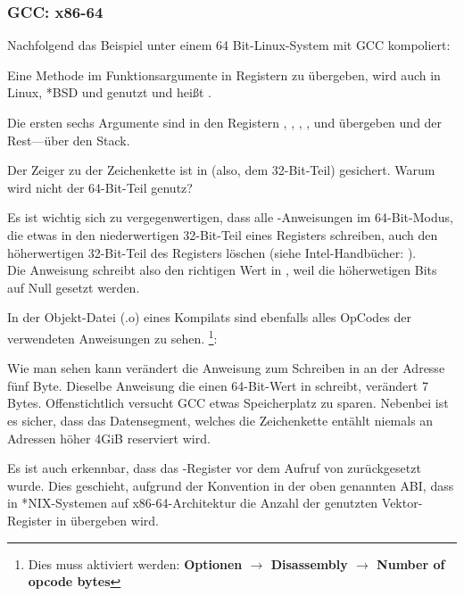 \subsubsection{GCC: x86-64}

Nachfolgend das Beispiel unter einem 64 Bit-Linux-System mit GCC kompoliert:



Eine Methode im Funktionsargumente in Registern zu übergeben, wird auch in Linux, *BSD und \MacOSX genutzt und heißt \SysVABI.

Die ersten sechs Argumente sind in den Registern \RDI, \RSI, \RDX, \RCX, und  übergeben und der Rest---über den Stack.

Der Zeiger zu der Zeichenkette ist in \EDI (also, dem 32-Bit-Teil) gesichert.
Warum wird nicht der 64-Bit-Teil \RDI genutz?

Es ist wichtig sich zu vergegenwertigen, dass alle \MOV-Anweisungen im 64-Bit-Modus, die etwas in den niederwertigen 32-Bit-Teil eines Registers schreiben,
auch den höherwertigen 32-Bit-Teil des Registers löschen (siehe Intel-Handbücher: ).\\
Die Anweisung  schreibt also den richtigen Wert in \RAX, weil die höherwetigen Bits auf Null gesetzt werden.

In der Objekt-Datei (.o) eines Kompilats sind ebenfalls alles OpCodes der verwendeten Anweisungen zu sehen.
\footnote{Dies muss aktiviert werden: \textbf{Optionen $\rightarrow$ Disassembly $\rightarrow$ Number of opcode bytes}}:



\label{hw_EDI_instead_of_RDI}
Wie man sehen kann verändert die Anweisung zum Schreiben in \EDI an der Adresse  fünf Byte.
Dieselbe Anweisung die einen 64-Bit-Wert in \RDI schreibt, verändert 7 Bytes.
Offenstichtlich versucht GCC etwas Speicherplatz zu sparen.
Nebenbei ist es sicher, dass das Datensegment, welches die Zeichenkette entählt niemals an Adressen höher 4\gls{GiB} reserviert wird.

\label{SysVABI_input_EAX}
Es ist auch erkennbar, dass das \EAX-Register vor dem Aufruf von \printf zurückgesetzt wurde.
Dies geschieht, aufgrund der Konvention in der oben genannten \ac{ABI}, dass in *NIX-Systemen auf x86-64-Architektur
die Anzahl der genutzten Vektor-Register in \EAX übergeben wird.
